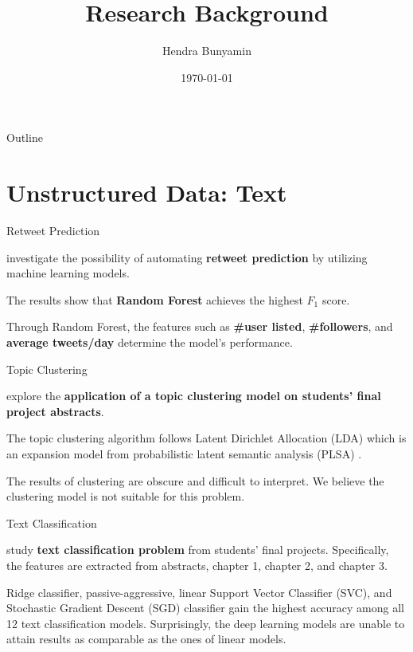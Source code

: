 \documentclass[aspectratio=169]{beamer}
\title[Research Background]{Research Background}
\author{Hendra Bunyamin}
\institute{Maranatha Christian University}
\date{\today}
\begin{document}
\maketitle

\begin{frame}{Outline}
    \tableofcontents
\end{frame}

\section{Unstructured Data: Text}
\begin{frame}{Retweet Prediction }
    \begin{vfilleditems}
	\item \citet{bunyamin2016comparison} investigate the possibility of automating \textbf{retweet prediction} by utilizing machine learning models.
	\item The results show that \textbf{Random Forest} achieves the highest $F_1$ score.
	\item  Through Random Forest, the features such as \textbf{\#user listed}, \textbf{\#followers}, and \textbf{average tweets/day} determine the model's performance.
	\end{vfilleditems}
\end{frame}

\begin{frame}{Topic Clustering}
    \begin{vfilleditems}
	\item \citet{bunyamin2017automatic} explore the \textbf{application of a topic clustering model on students' final project abstracts}. 
	\item The topic clustering algorithm follows Latent Dirichlet Allocation (LDA) which is an expansion model from probabilistic latent semantic analysis (PLSA) \citep{hofmann1999probabilistic}.
	\item The results of clustering are obscure and difficult to interpret. We believe the clustering model is not suitable for this problem.
\end{vfilleditems}	
\end{frame}

\begin{frame}{Text Classification}
    \begin{vfilleditems}
	\item \citet{bunyamin2019topic}  study \textbf{text classification problem} from students' final projects. Specifically, the features are extracted from abstracts, chapter 1, chapter 2, and chapter 3.
	\item Ridge classifier, passive-aggressive,  linear Support Vector Classifier (SVC), and Stochastic Gradient Descent (SGD) classifier gain the highest accuracy among all 12 text classification models. Surprisingly, the deep learning models  are unable to attain results as comparable as the ones of linear models.
\end{vfilleditems}		
\end{frame}
\end{document}
